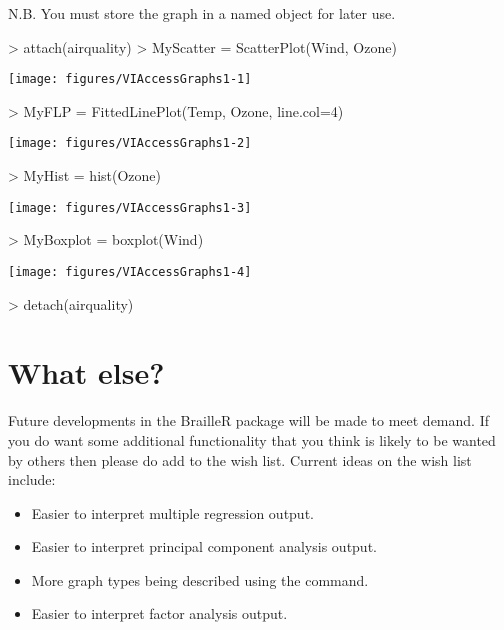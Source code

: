 N.B. You must store the graph in a named object for later use.




\begin{Schunk}
\begin{Sinput}
> attach(airquality)
> MyScatter = ScatterPlot(Wind, Ozone)
\end{Sinput}

\texttt{[image: figures/VIAccessGraphs1-1]} \begin{Sinput}
> MyFLP = FittedLinePlot(Temp, Ozone, line.col=4)
\end{Sinput}

\texttt{[image: figures/VIAccessGraphs1-2]} \begin{Sinput}
> MyHist = hist(Ozone)
\end{Sinput}

\texttt{[image: figures/VIAccessGraphs1-3]} \begin{Sinput}
> MyBoxplot = boxplot(Wind)
\end{Sinput}

\texttt{[image: figures/VIAccessGraphs1-4]} \begin{Sinput}
> detach(airquality)
\end{Sinput}
\end{Schunk}
 
\section{What else?} 
 
Future developments in the BrailleR package will be made to meet demand. If you do want some additional functionality that you think is likely to be wanted by others then please do add to the wish list. Current ideas on the wish list include: 
\begin{itemize} 
\item Easier to interpret multiple regression output. 
\item Easier to interpret principal component analysis output. 
\item More graph types being described using the  command. 
\item Easier to interpret factor analysis output. 
\end{itemize} 
 
 
 



